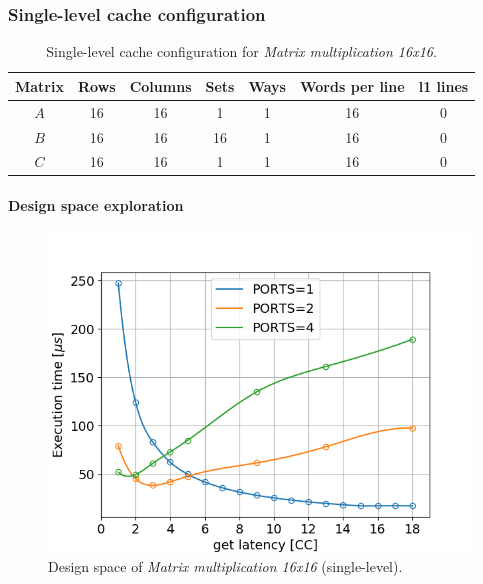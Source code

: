 \documentclass[11pt,a4paper,oneside]{memoir}
\begin{document}
\subsubsection{Single-level cache configuration}
\begin{table}[!htb]
	\begin{center}
		\begin{tabular}{ccccccc}
			\hline
			\rowcolor{gray!50}
			\textbf{Matrix} & \textbf{Rows} & \textbf{Columns} &
			\textbf{Sets} & \textbf{Ways} & \textbf{Words per line} &
			\textbf{\ac{l1} lines} \\
			\hline
			$A$ & 16 & 16 & 1 & 1 & 16 & 0 \\
			\rowcolor{gray!25}
			$B$ & 16 & 16 & 16 & 1 & 16 & 0 \\
			$C$ & 16 & 16 & 1 & 1 & 16 & 0 \\
			\hline
		\end{tabular}
	\end{center}
	\caption{Single-level cache configuration for \emph{Matrix
	multiplication 16x16}.}
	\label{tab:matmul_16_no_l1_config}
\end{table}

\paragraph{Design space exploration}
\begin{figure}[!htb]
	\centering
	\includegraphics[width=.8\textwidth]{matmul_16_multiport_latency}
	\caption{Design space of \emph{Matrix multiplication 16x16}
	(single-level).}
	\label{fig:matmul_16_no_l1_space}
\end{figure}
\end{document}
